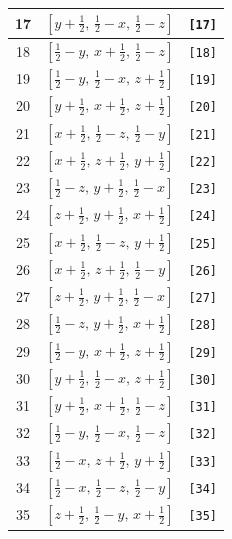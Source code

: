 \documentclass[fleqn,8pt]{jsarticle}
\begin{document}
\begin{longtable}{ccc}
17 & $\left[ y + \frac{1}{2},\, \frac{1}{2} - x,\, \frac{1}{2} - z \right]$ & {\tt [17]} \\ \hline
18 & $\left[ \frac{1}{2} - y,\, x + \frac{1}{2},\, \frac{1}{2} - z \right]$ & {\tt [18]} \\ \hline
19 & $\left[ \frac{1}{2} - y,\, \frac{1}{2} - x,\, z + \frac{1}{2} \right]$ & {\tt [19]} \\ \hline
20 & $\left[ y + \frac{1}{2},\, x + \frac{1}{2},\, z + \frac{1}{2} \right]$ & {\tt [20]} \\ \hline
21 & $\left[ x + \frac{1}{2},\, \frac{1}{2} - z,\, \frac{1}{2} - y \right]$ & {\tt [21]} \\ \hline
22 & $\left[ x + \frac{1}{2},\, z + \frac{1}{2},\, y + \frac{1}{2} \right]$ & {\tt [22]} \\ \hline
23 & $\left[ \frac{1}{2} - z,\, y + \frac{1}{2},\, \frac{1}{2} - x \right]$ & {\tt [23]} \\ \hline
24 & $\left[ z + \frac{1}{2},\, y + \frac{1}{2},\, x + \frac{1}{2} \right]$ & {\tt [24]} \\ \hline
25 & $\left[ x + \frac{1}{2},\, \frac{1}{2} - z,\, y + \frac{1}{2} \right]$ & {\tt [25]} \\ \hline
26 & $\left[ x + \frac{1}{2},\, z + \frac{1}{2},\, \frac{1}{2} - y \right]$ & {\tt [26]} \\ \hline
27 & $\left[ z + \frac{1}{2},\, y + \frac{1}{2},\, \frac{1}{2} - x \right]$ & {\tt [27]} \\ \hline
28 & $\left[ \frac{1}{2} - z,\, y + \frac{1}{2},\, x + \frac{1}{2} \right]$ & {\tt [28]} \\ \hline
29 & $\left[ \frac{1}{2} - y,\, x + \frac{1}{2},\, z + \frac{1}{2} \right]$ & {\tt [29]} \\ \hline
30 & $\left[ y + \frac{1}{2},\, \frac{1}{2} - x,\, z + \frac{1}{2} \right]$ & {\tt [30]} \\ \hline
31 & $\left[ y + \frac{1}{2},\, x + \frac{1}{2},\, \frac{1}{2} - z \right]$ & {\tt [31]} \\ \hline
32 & $\left[ \frac{1}{2} - y,\, \frac{1}{2} - x,\, \frac{1}{2} - z \right]$ & {\tt [32]} \\ \hline
33 & $\left[ \frac{1}{2} - x,\, z + \frac{1}{2},\, y + \frac{1}{2} \right]$ & {\tt [33]} \\ \hline
34 & $\left[ \frac{1}{2} - x,\, \frac{1}{2} - z,\, \frac{1}{2} - y \right]$ & {\tt [34]} \\ \hline
35 & $\left[ z + \frac{1}{2},\, \frac{1}{2} - y,\, x + \frac{1}{2} \right]$ & {\tt [35]} \\ \hline

\end{longtable}
\end{document}
